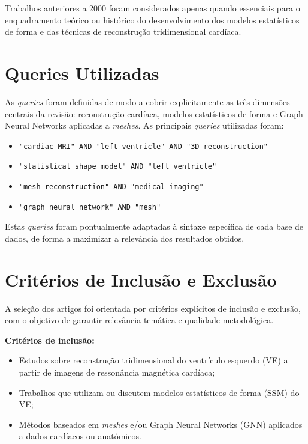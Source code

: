 \documentclass[12pt,a4paper]{report}
\begin{document}
Trabalhos anteriores a 2000 foram considerados apenas quando essenciais para o enquadramento teórico ou histórico do desenvolvimento dos modelos estatísticos de forma e das técnicas de reconstrução tridimensional cardíaca.

\section{Queries Utilizadas}

As \textit{queries} foram definidas de modo a cobrir explicitamente as três dimensões centrais da revisão: reconstrução cardíaca, modelos estatísticos de forma e Graph Neural Networks aplicadas a \textit{meshes}. As principais \textit{queries} utilizadas foram:

\begin{itemize}
    \item \texttt{"cardiac MRI" AND "left ventricle" AND "3D reconstruction"}
    \item \texttt{"statistical shape model" AND "left ventricle"}
    \item \texttt{"mesh reconstruction" AND "medical imaging"}
    \item \texttt{"graph neural network" AND "mesh"}
\end{itemize}

Estas \textit{queries} foram pontualmente adaptadas à sintaxe específica de cada base de dados, de forma a maximizar a relevância dos resultados obtidos.

\section{Critérios de Inclusão e Exclusão}

A seleção dos artigos foi orientada por critérios explícitos de inclusão e exclusão, com o objetivo de garantir relevância temática e qualidade metodológica.

\noindent\textbf{Critérios de inclusão:}
\begin{itemize}
    \item Estudos sobre reconstrução tridimensional do ventrículo esquerdo (VE) a partir de imagens de ressonância magnética cardíaca;
    \item Trabalhos que utilizam ou discutem modelos estatísticos de forma (SSM) do VE;
    \item Métodos baseados em \textit{meshes} e/ou Graph Neural Networks (GNN) aplicados a dados cardíacos ou anatómicos.
\end{itemize}
\end{document}

